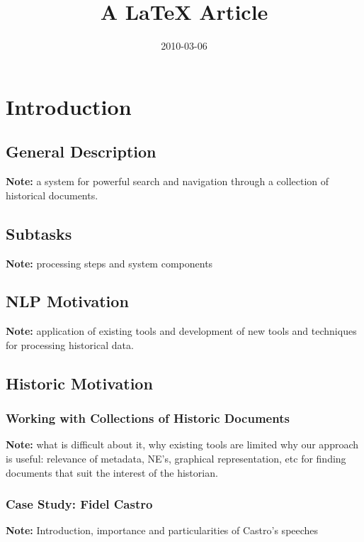 \documentclass[11pt]{article}
\title{A LaTeX Article}
\author{  }
\date{2010-03-06}
\newcommand{\note}[1]{{\textbf{Note:} \color{blue} #1}}
\begin{document}
\ifpdf
{}
\else
{}
\fi

\maketitle
\tableofcontents

\begin{abstract}
\end{abstract}


\section{Introduction} %
\label{sec:introduction}


	\subsection{General Description}
	\note a system for powerful search and navigation through a collection of historical documents.
	
	\subsection{Subtasks}
 	\note processing steps and system components

	\subsection {NLP Motivation}
	\note application of existing tools and development of new tools and techniques for processing historical data.
	
	\subsection{Historic Motivation}
		\subsubsection{Working with Collections of Historic Documents}
 		\note what is difficult about it, why existing tools are limited 
 					why our approach is useful:
 					relevance of metadata, NE's, graphical representation, etc for finding documents that suit the interest of the 
 					historian.
		\subsubsection{Case Study: Fidel Castro}
 		\note Introduction, importance and particularities of Castro's speeches
\end{document}
